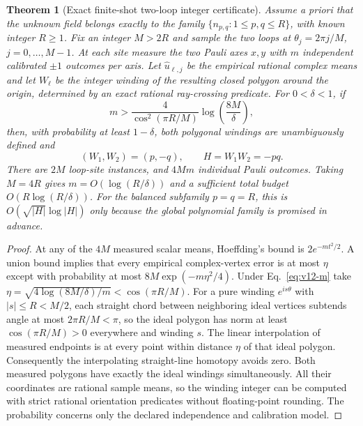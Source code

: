 \documentclass[aps,prd,onecolumn,notitlepage,11pt,superscriptaddress,longbibliography]{revtex4-2}
\newtheorem{theorem}{Theorem}
\begin{document}
\begin{theorem}[Exact finite-shot two-loop integer certificate]\label{th:v12-loopshots}
Assume a priori that the unknown field belongs \emph{exactly} to the family $\{n_{p,q}:1\le p,q\le R\}$, with known integer $R\ge1$. Fix an integer $M>2R$ and sample the two loops at $\theta_j=2\pi j/M$, $j=0,\ldots,M-1$. At each site measure the two Pauli axes $x,y$ with $m$ \emph{independent calibrated} $\pm1$ outcomes per axis. Let $\widehat u_{\ell,j}$ be the empirical rational complex means and let $W_\ell$ be the integer winding of the resulting closed polygon around the origin, determined by an exact rational ray-crossing predicate. For $0<\delta<1$, if
\begin{equation}\label{eq:v12-m}
\boxed{\quad m>\frac{4}{\cos^2(\pi R/M)}\log\!\left(\frac{8M}{\delta}\right),\quad}
\end{equation}
then, with probability at least $1-\delta$, \emph{both} polygonal windings are unambiguously defined and
\begin{equation}\label{eq:v12-recover}
\boxed{\quad (W_1,W_2)=(p,-q),\qquad H=W_1W_2=-pq.\quad}
\end{equation}
There are $2M$ loop-site instances, and $4Mm$ individual Pauli outcomes. Taking $M=4R$ gives $m=O(\log(R/\delta))$ and a sufficient total budget $O(R\log(R/\delta))$. For the balanced subfamily $p=q=R$, this is $O(\sqrt{|H|}\log |H|)$ \emph{only because the global polynomial family is promised in advance}.
\end{theorem}
\begin{proof}
At any of the $4M$ measured scalar means, Hoeffding's bound is $2e^{-mt^2/2}$. A union bound implies that every empirical complex-vertex error is at most $\eta$ except with probability at most $8M\exp(-m\eta^2/4)$. Under Eq.~\eqref{eq:v12-m} take $\eta=\sqrt{4\log(8M/\delta)/m}<\cos(\pi R/M)$. For a pure winding $e^{is\theta}$ with $|s|\le R<M/2$, each straight chord between neighboring ideal vertices subtends angle at most $2\pi R/M<\pi$, so the ideal polygon has norm at least $\cos(\pi R/M)>0$ everywhere and winding $s$. The linear interpolation of measured endpoints is at every point within distance $\eta$ of that ideal polygon. Consequently the interpolating straight-line homotopy avoids zero. Both measured polygons have exactly the ideal windings simultaneously. All their coordinates are rational sample means, so the winding integer can be computed with strict rational orientation predicates without floating-point rounding. The probability concerns only the declared independence and calibration model.
\end{proof}
\end{document}
